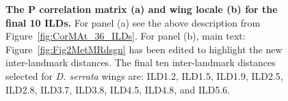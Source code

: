 \captionsetup[figure]{position=top}
\begin{figure}[!tbp]
  \centering
{}
\qquad
  \caption[The P correlation matrix (a) and wing locale (b) for the final 10 ILDs.]{\textbf{The P correlation matrix (a) and wing locale (b) for the final 10 ILDs.} For panel (a) see the above description from Figure~\ref{fig:CorMAt_36_ILDs}. For panel (b),  main text: Figure~\ref{fig:Fig2MetMRdsgn} has been edited to highlight the new inter-landmark distances. The final ten inter-landmark distances selected for \textit{D. serrata} wings are: ILD1.2, ILD1.5, ILD1.9, ILD2.5, ILD2.8, ILD3.7, ILD3.8, ILD4.5, ILD4.8, and ILD5.6. }
\end{figure}







